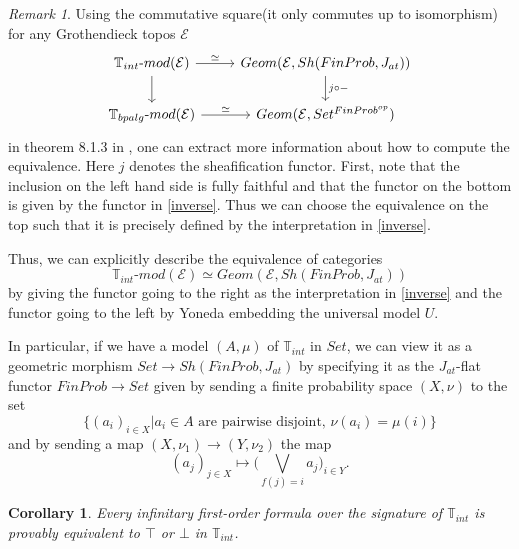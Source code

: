 \documentclass[a4paper]{amsproc}
\theoremstyle{plain}
\newtheorem{corollary}[theorem]{Corollary}
\theoremstyle{definition}
\theoremstyle{remark}
\newtheorem{remark}[theorem]{Remark}
\numberwithin{equation}{section}
\begin{document}
\begin{remark} \label{classifying_equiv_data}
Using the commutative square(it only commutes up to isomorphism) for any Grothendieck topos $\mathcal{E}$
\[
\begin{tikzcd}
\mathbb{T}_{int}\text{-}mod(\mathcal{E}) \arrow[d] \arrow[r, "\simeq"] & {Geom(\mathcal{E},Sh(FinProb,J_{at}))} \arrow[d, "j \circ -"] \\
\mathbb{T}_{bpalg}\text{-}mod(\mathcal{E}) \arrow[r, "\simeq"]         & {Geom(\mathcal{E},Set^{FinProb^{op}})}                       
\end{tikzcd}
\]
in theorem 8.1.3 in \cite{caramello_book}, one can extract more information about how to compute the equivalence. Here $j$ denotes the sheafification functor. First, note that the inclusion on the left hand side is fully faithful and that the functor on the bottom is given by the functor in \ref{inverse}. Thus we can choose the equivalence on the top such that it is precisely defined by the interpretation in \ref{inverse}.

Thus, we can explicitly describe the equivalence of categories
\[
    \mathbb{T}_{int}\text{-}mod(\mathcal{E}) \simeq Geom(\mathcal{E},Sh(FinProb,J_{at}))
\]
by giving the functor going to the right as the interpretation in \ref{inverse} and the functor going to the left by Yoneda embedding the universal model $U$.

In particular, if we have a model $(A,\mu)$ of $\mathbb{T}_{int}$ in $Set$, we can view it as a geometric morphism $Set \to Sh(FinProb, J_{at})$ by specifying it as the $J_{at}$-flat functor $FinProb \to Set$ given by sending a finite probability space $(X,\nu)$ to the set
\[
\{(a_i)_{i \in X} | a_i \in A \text{ are pairwise disjoint, } \nu(a_i) = \mu(i) \}
\]
and by sending a map $(X,\nu_1) \to (Y,\nu_2)$ the map
\[
(a_j)_{j \in X} \mapsto \big (\bigvee_{f(j) = i} a_j \big )_{i \in Y} .
\]
\end{remark}

\begin{corollary}
Every infinitary first-order formula over the signature of $\mathbb{T}_{int}$ is provably equivalent to $\top$ or $\bot$ in $\mathbb{T}_{int}$.
\end{corollary}
\end{document}

